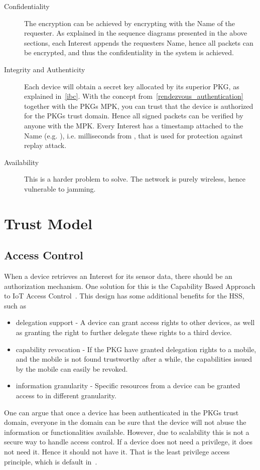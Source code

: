 \begin{description}
  \item[Confidentiality] 
  The encryption can be achieved by encrypting with the Name of the requester.
  As explained in the sequence diagrams presented in the above sections, each Interest appends the requesters Name, hence all packets can be encrypted, and thus the confidentiality in the system is achieved.
  \item[Integrity and Authenticity]
  Each device will obtain a secret key allocated by its superior \gls{PKG}, as explained in~\autoref{ibc}.
  With the concept from~\autoref{rendezvous_authentication} together with the \gls{PKG}s \gls{MPK}, you can trust that the device is authorized for the \gls{PKG}s trust domain. Hence all signed packets can be verified by anyone with the \gls{MPK}.
  Every Interest has a timestamp attached to the Name (e.g. ), i.e. milliseconds from , that is used for protection against replay attack. 
  \item[Availability]
  This is a harder problem to solve.
  The network is purely wireless, hence vulnerable to jamming. 
\end{description}

\section{Trust Model}

\subsection{Access Control}\label{access_control}

When a device retrieves an Interest for its sensor data, there should be an authorization mechanism. 
One solution for this is the Capability Based Approach to \gls{IoT} Access Control~\cite{DBLP:conf/imis/GusmeroliPR12}.
This design has some additional benefits for the \gls{HSS}, such as

\begin{itemize}
  \item delegation support - 
  A device can grant access rights to other devices, as well as granting the right to further delegate these rights to a third device.
  \item capability revocation - 
  If the \gls{PKG} have granted delegation rights to a mobile, and the mobile is not found trustworthy after a while, the capabilities issued by the mobile can easily be revoked.
  \item information granularity - 
  Specific resources from a device can be granted access to in different granularity.
\end{itemize}

One can argue that once a device has been authenticated in the \gls{PKG}s trust domain, everyone in the domain can be sure that the device will not abuse the information or functionalities available. 
However, due to scalability this is not a secure way to handle access control. 
If a device does not need a privilege, it does not need it.
Hence it should not have it. 
That is the least privilege access principle, which is default in~\cite{DBLP:conf/imis/GusmeroliPR12}.